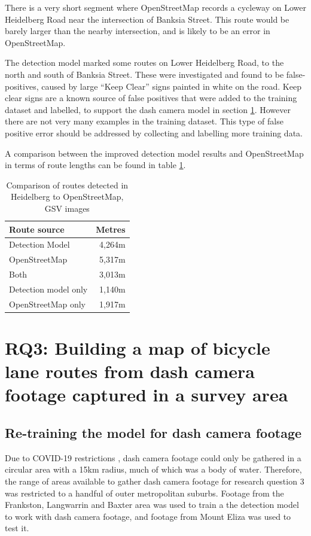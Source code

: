 \documentclass[11pt,twoside]{report}
\begin{document}
There is a very short segment where OpenStreetMap records a cycleway on Lower Heidelberg Road near the intersection of Banksia Street.  This route would be barely larger than the nearby intersection, and is likely to be an error in OpenStreetMap.

The detection model marked some routes on Lower Heidelberg Road, to the north and south of Banksia Street.  These were investigated and found to be false-positives, caused by large ``Keep Clear'' signs painted in white on the road.  Keep clear signs are a known source of false positives that were added to the training dataset and labelled, to support the dash camera model in section \ref{results:rq3}.  However there are not very many examples in the training dataset.  This type of false positive error should be addressed by collecting and labelling more training data.

A comparison between the improved detection model results and OpenStreetMap in terms of route lengths can be found in table \ref{table_metres_rq2_h}.

\begin{table}[h]
\centering
\begin{tabular}{|l|r||}
\hline
\textbf{Route source} & \textbf{Metres} \\
\hline
Detection Model & 4,264m \\
OpenStreetMap & 5,317m \\
Both & 3,013m \\
Detection model only & 1,140m \\
OpenStreetMap only & 1,917m \\
\hline
\end{tabular}
\caption{Comparison of routes detected in Heidelberg to OpenStreetMap, GSV images}
\label{table_metres_rq2_h}
\end{table}


\section{RQ3: Building a map of bicycle lane routes from dash camera footage captured in a survey area}
\label{results:rq3}

\subsection{Re-training the model for dash camera footage}

Due to COVID-19 restrictions \cite{lockdown_record} \cite{lockdown_5km}, dash camera footage could only be gathered in a circular area with a 15km radius, much of which was a body of water.  Therefore, the range of areas available to gather dash camera footage for research question 3 was restricted to a handful of outer metropolitan suburbs.  Footage from the Frankston, Langwarrin and Baxter area was used to train a the detection model to work with dash camera footage, and footage from Mount Eliza was used to test it.
\end{document}
